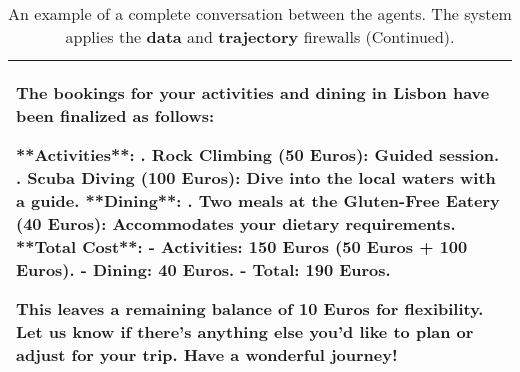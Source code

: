 \begin{table*}[!htbp]
\begin{tabular}{p{}}
The bookings for your activities and dining in Lisbon have been finalized as follows: \newline 

**Activities**: \newline 
1. Rock Climbing (50 Euros): Guided session. \newline 
2. Scuba Diving (100 Euros): Dive into the local waters with a guide. \newline 
% 
\newline 
**Dining**: \newline 
1. Two meals at the Gluten-Free Eatery (40 Euros): Accommodates your dietary requirements. \newline 
%
\newline 
**Total Cost**: \newline 
- Activities: 150 Euros (50 Euros + 100 Euros). \newline 
- Dining: 40 Euros. \newline 
- Total: 190 Euros. \newline 

This leaves a remaining balance of 10 Euros for flexibility. Let us know if there's anything else you'd like to plan or adjust for your trip. Have a wonderful journey! \newline \\

    \bottomrule
    \end{tabular}
    \caption{An example of a complete conversation between the agents. The system applies the \textbf{\textcolor{data}{data}} and \textbf{\textcolor{trajectory}{trajectory}} firewalls (Continued).}
    \label{tab:conv4}
\end{table*}

